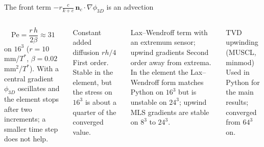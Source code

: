 \documentclass[aspectratio=169,11pt]{beamer}
\newcommand{\fterm}{\ensuremath{-r\tfrac{c}{k+c}\,\mathbf n_c\cdot\nabla \phi_{3D}}}
\begin{document}
\begin{frame}{The front term \fterm{} is an advection}
\begin{columns}[T]
\[\mathrm{Pe}=\frac{r\,h}{2\beta}\approx 31\]
on $16^3$ ($r=10$\,mm/$T^*$, $\beta=0.02$\,mm$^2$/$T^*$). With a central gradient $\phi_{3D}$ oscillates and the
element stops after two increments; a smaller time step does not help.
\small
\begin{block}{Constant added diffusion $r h/4$}
First order. Stable in the element, but the stress on $16^3$ is about a quarter of the converged value.
\end{block}
\begin{block}{Lax--Wendroff term with an extremum sensor; upwind gradients}
Second order away from extrema. In the element the Lax--Wendroff form matches Python on $16^3$ but is unstable on
$24^3$; upwind MLS gradients are stable on $8^3$ to $24^3$.
\end{block}
\begin{block}{TVD upwinding (MUSCL, minmod)}
Used in Python for the main results; converged from $64^3$ on.
\end{block}
\end{columns}
\end{frame}
\end{document}
